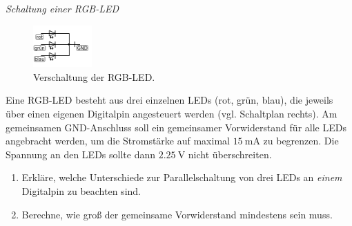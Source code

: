 \begin{aufgabe} \emph{Schaltung einer RGB-LED}
	
	\begin{figure}
		\vspace{-\baselineskip}
		\centering
		\includegraphics[width=0.2\textwidth]{./pics/rgb-led-schaltplan.png}
		\caption{Verschaltung der RGB-LED.}
		\vspace{-\baselineskip}
	\end{figure}
	Eine RGB-LED besteht aus drei einzelnen LEDs (rot, grün, blau), die jeweils über einen eigenen Digitalpin angesteuert werden (vgl. Schaltplan rechts). Am gemeinsamen GND-Anschluss soll ein gemeinsamer Vorwiderstand für alle LEDs angebracht werden, um die Stromstärke auf maximal $\SI{15}{\milli\ampere}$ zu begrenzen. Die Spannung an den LEDs sollte dann $\SI{2,25}{\volt}$ nicht überschreiten.
	\begin{enumerate}[label=\alph*), itemsep=0ex]
		\item Erkläre, welche Unterschiede zur Parallelschaltung von drei LEDs an \emph{einem} Digitalpin zu beachten sind.
		\item Berechne, wie groß der gemeinsame Vorwiderstand mindestens sein muss.
	\end{enumerate}
\end{aufgabe}


